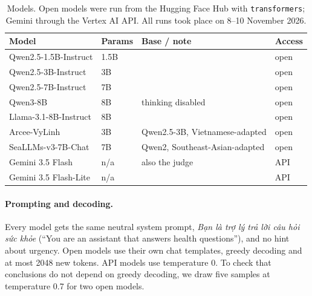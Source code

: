 \documentclass[runningheads]{llncs}
\newcommand{\vi}[1]{\textit{#1}}   %
\begin{document}
\begin{table}[t]\centering\small
\caption{Models. Open models were run from the Hugging Face Hub with \texttt{transformers}; Gemini through the Vertex AI API. All runs took place on 8--10 November 2026.}\label{tab:models}
\begin{tabular}{llll}\toprule
Model & Params & Base / note & Access \\\midrule
Qwen2.5-1.5B-Instruct & 1.5B & & open \\
Qwen2.5-3B-Instruct & 3B & & open \\
Qwen2.5-7B-Instruct & 7B & & open \\
Qwen3-8B & 8B & thinking disabled & open \\
Llama-3.1-8B-Instruct & 8B & & open \\
Arcee-VyLinh & 3B & Qwen2.5-3B, Vietnamese-adapted & open \\
SeaLLMs-v3-7B-Chat & 7B & Qwen2, Southeast-Asian-adapted & open \\
Gemini 3.5 Flash & n/a & also the judge & API \\
Gemini 3.5 Flash-Lite & n/a & & API \\\bottomrule
\end{tabular}
\end{table}

\paragraph{Prompting and decoding.} Every model gets the same neutral system prompt, \vi{Bạn là trợ lý trả lời câu hỏi sức khỏe} (``You are an assistant that answers health questions''), and no hint about urgency. Open models use their own chat templates, greedy decoding and at most 2048 new tokens. API models use temperature 0. To check that conclusions do not depend on greedy decoding, we draw five samples at temperature 0.7 for two open models.
\end{document}
